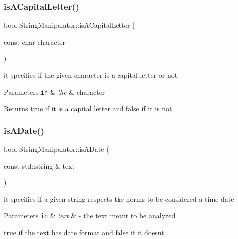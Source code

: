 \subsubsection{\texorpdfstring{is\+A\+Capital\+Letter()}{isACapitalLetter()}}
{\footnotesize\ttfamily bool String\+Manipulator\+::is\+A\+Capital\+Letter (\begin{DoxyParamCaption}\item[{const char}]{character }\end{DoxyParamCaption})\hspace{0.3cm}{\ttfamily [static]}}

it specifies if the given character is a capital letter or not


\begin{DoxyParams}[1]{Parameters}
\mbox{\tt in}  & {\em the} & character\\
\hline
\end{DoxyParams}
\begin{DoxyReturn}{Returns}
true if it is a capital letter and false if it is not 
\end{DoxyReturn}
\mbox{\label{class_string_manipulator_a65e4f86e702032166fa31019e2562984}} 
\subsubsection{\texorpdfstring{is\+A\+Date()}{isADate()}}
{\footnotesize\ttfamily bool String\+Manipulator\+::is\+A\+Date (\begin{DoxyParamCaption}\item[{const std\+::string \&}]{text }\end{DoxyParamCaption})\hspace{0.3cm}{\ttfamily [static]}}

it specifies if a given string respects the norms to be considered a time date


\begin{DoxyParams}[1]{Parameters}
\mbox{\tt in}  & {\em text} & -\/ the text meant to be analyzed\\
\hline
\end{DoxyParams}
true if the text has date format and false if it doesn\textquotesingle{}t \mbox{\label{class_string_manipulator_a7cae6c9bcfd1d924f20ebbcf3b61f52a}} 
